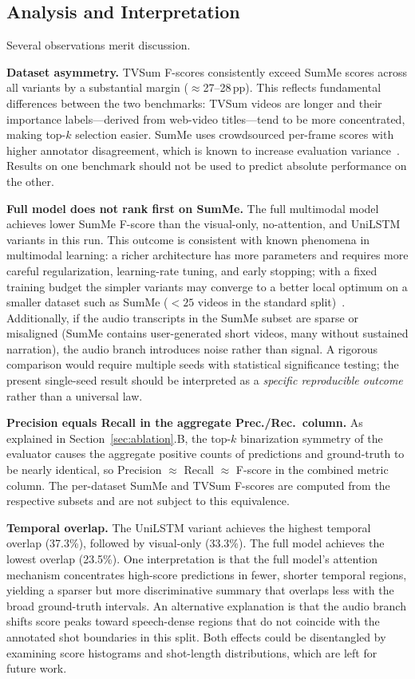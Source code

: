 \documentclass[10pt,conference]{IEEEtran}
\begin{document}
\subsection{Analysis and Interpretation}

Several observations merit discussion.

\textbf{Dataset asymmetry.}
TVSum F-scores consistently exceed SumMe scores across all variants by
a substantial margin ($\approx$27--28\,pp). This reflects
fundamental differences between the two benchmarks: TVSum videos are
longer and their importance labels---derived from web-video titles---tend
to be more concentrated, making top-$k$ selection easier. SumMe uses
crowdsourced per-frame scores with higher annotator disagreement, which is
known to increase evaluation variance~\cite{gygli2014,song2015}. Results on
one benchmark should not be used to predict absolute performance on the other.

\textbf{Full model does not rank first on SumMe.}
The full multimodal model achieves lower SumMe F-score than the
visual-only, no-attention, and UniLSTM variants in this run. This outcome
is consistent with known phenomena in multimodal learning: a richer
architecture has more parameters and requires more careful regularization,
learning-rate tuning, and early stopping; with a fixed training budget the
simpler variants may converge to a better local optimum on a smaller
dataset such as SumMe ($<25$ videos in the standard split)~\cite{apostolidis2021pgl}.
Additionally, if the audio transcripts in the SumMe subset are sparse or
misaligned (SumMe contains user-generated short videos, many without
sustained narration), the audio branch introduces noise rather than
signal. A rigorous comparison would require multiple seeds with statistical
significance testing; the present single-seed result should be interpreted
as a \emph{specific reproducible outcome} rather than a universal law.

\textbf{Precision equals Recall in the aggregate Prec./Rec.\ column.}
As explained in Section~\ref{sec:ablation}.B, the top-$k$ binarization
symmetry of the evaluator causes the aggregate positive counts of
predictions and ground-truth to be nearly identical, so Precision $\approx$
Recall $\approx$ F-score in the combined metric column. The per-dataset
SumMe and TVSum F-scores are computed from the respective subsets and are
not subject to this equivalence.

\textbf{Temporal overlap.}
The UniLSTM variant achieves the highest temporal overlap (37.3\%),
followed by visual-only (33.3\%). The full model achieves the lowest
overlap (23.5\%). One interpretation is that the full model's attention
mechanism concentrates high-score predictions in fewer, shorter temporal
regions, yielding a sparser but more discriminative summary that overlaps
less with the broad ground-truth intervals. An alternative explanation is
that the audio branch shifts score peaks toward speech-dense regions that
do not coincide with the annotated shot boundaries in this split.
Both effects could be disentangled by examining score histograms and
shot-length distributions, which are left for future work.
\end{document}
